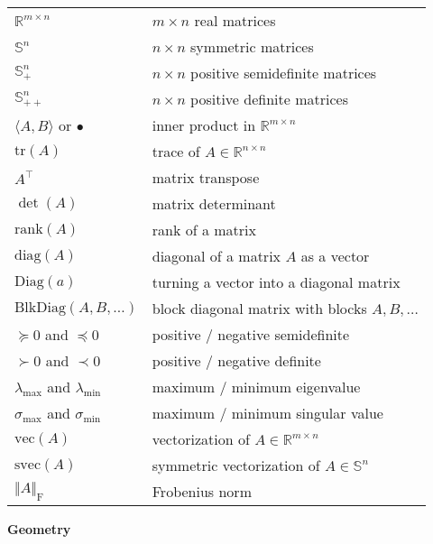 \documentclass[
]{book}
\begin{document}
\begin{longtable}[]{@{}
  >{\raggedright\arraybackslash}p{}
  >{\raggedright\arraybackslash}p{}@{}}
\toprule()
\endhead
\(\mathbb{R}^{m \times n}\) & \(m \times n\) real matrices \\
\(\mathbb{S}^{n}\) & \(n\times n\) symmetric matrices \\
\(\mathbb{S}^{n}_{+}\) & \(n\times n\) positive semidefinite matrices \\
\(\mathbb{S}^{n}_{++}\) & \(n\times n\) positive definite matrices \\
\(\langle A, B \rangle\) or \(\bullet\) & inner product in \(\mathbb{R}^{m \times n}\) \\
\(\mathrm{tr}(A)\) & trace of \(A \in \mathbb{R}^{n \times n}\) \\
\(A^\top\) & matrix transpose \\
\(\det(A)\) & matrix determinant \\
\(\mathrm{rank}(A)\) & rank of a matrix \\
\(\mathrm{diag}(A)\) & diagonal of a matrix \(A\) as a vector \\
\(\mathrm{Diag}(a)\) & turning a vector into a diagonal matrix \\
\(\mathrm{BlkDiag}(A,B,\dots)\) & block diagonal matrix with blocks \(A,B,\dots\) \\
\(\succeq 0\) and \(\preceq 0\) & positive / negative semidefinite \\
\(\succ 0\) and \(\prec 0\) & positive / negative definite \\
\(\lambda_{\max}\) and \(\lambda_{\min}\) & maximum / minimum eigenvalue \\
\(\sigma_{\max}\) and \(\sigma_{\min}\) & maximum / minimum singular value \\
\(\mathrm{vec}(A)\) & vectorization of \(A \in \mathbb{R}^{m \times n}\) \\
\(\mathrm{svec}(A)\) & symmetric vectorization of \(A \in \mathbb{S}^{n}\) \\
\(\Vert A \Vert_\mathrm{F}\) & Frobenius norm \\
\bottomrule()
\end{longtable}

\textbf{Geometry}
\end{document}
